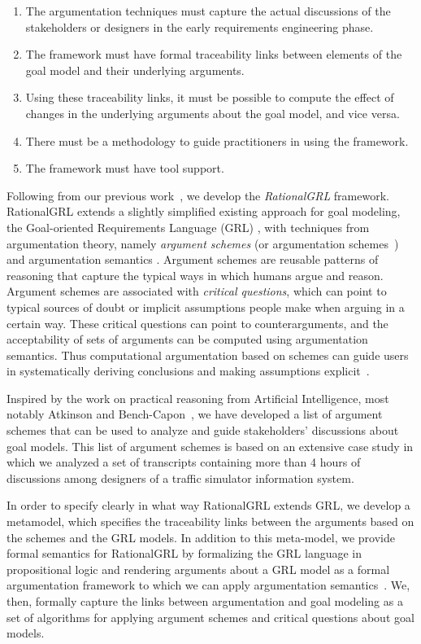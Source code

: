 \begin{enumerate}
\item 
The argumentation techniques must capture the actual discussions of the stakeholders or designers in the early requirements engineering phase.
\item 
The framework must have formal traceability links between elements of the goal model and their underlying arguments.
\item 
Using these traceability links, it must be possible to compute the effect of changes in the underlying arguments about the goal model, and vice versa.
\item 
There must be a methodology to guide practitioners in using the framework.
\item 
The framework must have tool support.
\end{enumerate}

Following from our previous work~\cite{vanzee-etal:renext2015,vanZee-etal:er2016}, we develop the \emph{RationalGRL} framework. RationalGRL extends a slightly simplified existing approach for goal modeling, the Goal-oriented Requirements Language (GRL) \cite{Amyot:2010:EGM:1841349.1841356}, with techniques from argumentation theory, namely \emph{argument schemes} (or argumentation schemes~\cite{walton-etal2008}) and argumentation semantics \cite{Dung1995}. Argument schemes are reusable patterns of reasoning that capture the typical ways in which humans argue and reason. Argument schemes are associated with \emph{critical questions}, which can point to typical sources of doubt or implicit assumptions people make when arguing in a certain way. These critical questions can point to counterarguments, and the acceptability of sets of arguments can be computed using argumentation semantics. Thus computational argumentation based on schemes can guide users in systematically deriving conclusions and making assumptions explicit~\cite{bexEtal2003,murukannaiah2015}. 

Inspired by the work on practical reasoning from Artificial Intelligence, most notably Atkinson and Bench-Capon~\cite{atkinson2007}, we have developed a list of argument schemes that can be used to analyze and guide stakeholders' discussions about goal models. This list of argument schemes is based on an extensive case study in which we analyzed a set of transcripts containing more than 4 hours of discussions among designers of a traffic simulator information system. 

In order to specify clearly in what way RationalGRL extends GRL, we develop a metamodel, which specifies the traceability links between the arguments based on the schemes and the GRL models. In addition to this meta-model, we provide formal semantics for RationalGRL by formalizing the GRL language in propositional logic and rendering arguments about a GRL model as a formal argumentation framework to which we can apply argumentation semantics~\cite{Dung1995}. We, then, formally capture the links between argumentation and goal modeling as a set of algorithms for applying argument schemes and critical questions about goal models. 


